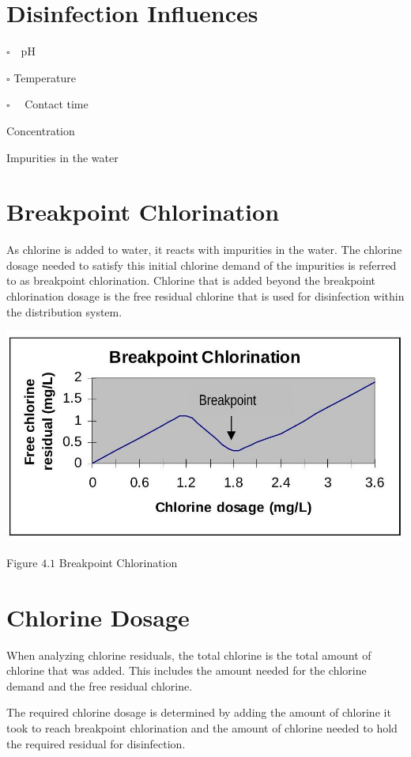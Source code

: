 \documentclass[10pt]{article}
\begin{document}
\section{Disinfection Influences}
$\square \quad \mathrm{pH}$

$\square$ Temperature

$\square \quad$ Contact time

Concentration

Impurities in the water

\section{Breakpoint Chlorination}
As chlorine is added to water, it reacts with impurities in the water. The chlorine dosage needed to satisfy this initial chlorine demand of the impurities is referred to as breakpoint chlorination. Chlorine that is added beyond the breakpoint chlorination dosage is the free residual chlorine that is used for disinfection within the distribution system.

\includegraphics[max width=\textwidth]{2022_10_30_098bb5f44c5986ff92a9g-64}

Figure $4.1$ Breakpoint Chlorination

\section{Chlorine Dosage}
When analyzing chlorine residuals, the total chlorine is the total amount of chlorine that was added. This includes the amount needed for the chlorine demand and the free residual chlorine.

The required chlorine dosage is determined by adding the amount of chlorine it took to reach breakpoint chlorination and the amount of chlorine needed to hold the required residual for disinfection.
\end{document}
